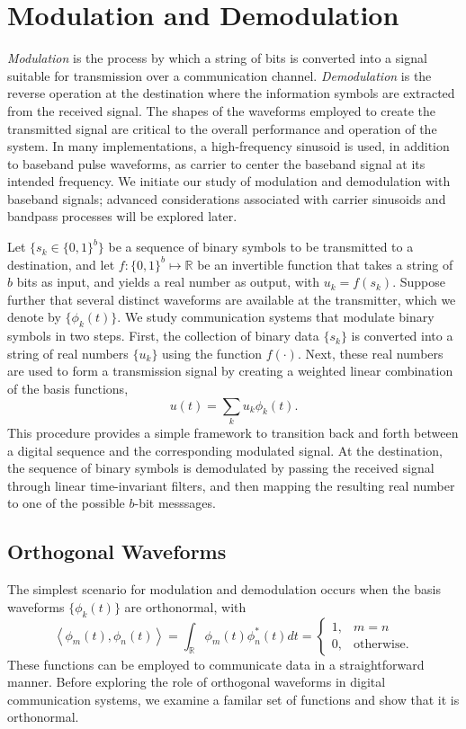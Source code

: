 \chapter{Modulation and Demodulation}

\emph{Modulation} is the process by which a string of bits is converted into a signal suitable for transmission over a communication channel.
\emph{Demodulation} is the reverse operation at the destination where the information symbols are extracted from the received signal.
The shapes of the waveforms employed to create the transmitted signal are critical to the overall performance and operation of the system.
In many implementations, a high-frequency sinusoid is used, in addition to baseband pulse waveforms, as carrier to center the baseband signal at its intended frequency.
We initiate our study of modulation and demodulation with baseband signals; advanced considerations associated with carrier sinusoids and bandpass processes will be explored later.

Let $\{ s_k \in \{ 0, 1 \}^b \}$ be a sequence of binary symbols to be transmitted to a destination, and let $f : \{ 0, 1 \}^b \mapsto \mathbb{R}$ be an invertible function that takes a string of $b$ bits as input, and yields a real number as output, with $u_k = f(s_k)$.
Suppose further that several distinct waveforms are available at the transmitter, which we denote by $\{ \phi_k (t) \}$.
We study communication systems that modulate binary symbols in two steps.
First, the collection of binary data $\{ s_k \}$ is converted into a string of real numbers $\{ u_k \}$ using the function $f(\cdot)$.
Next, these real numbers are used to form a transmission signal by creating a weighted linear combination of the basis functions,
\begin{equation*}
u(t) = \sum_k u_k \phi_k(t) .
\end{equation*}
This procedure provides a simple framework to transition back and forth between a digital sequence and the corresponding modulated signal.
At the destination, the sequence of binary symbols is demodulated by passing the received signal through linear time-invariant filters, and then mapping the resulting real number to one of the possible $b$-bit messsages.


\section{Orthogonal Waveforms}

The simplest scenario for modulation and demodulation occurs when the basis waveforms $\{ \phi_k (t) \}$ are orthonormal, with
\begin{equation*}
\left\langle \phi_m (t), \phi_n (t) \right\rangle
= \int_{\mathbb{R}} \phi_m (t) \phi_n^* (t) dt 
= \begin{cases} 1, & m = n \\
0, & \text{otherwise} . \end{cases}
\end{equation*}
These functions can be employed to communicate data in a straightforward manner.
Before exploring the role of orthogonal waveforms in digital communication systems, we examine a familar set of functions and show that it is orthonormal.

